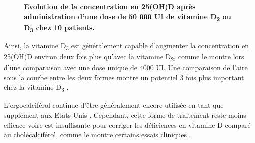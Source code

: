 \documentclass[
  a4paper,
  DIV=11,
  numbers=noendperiod,
  listof=totoc]{scrreprt}
\begin{document}
\begin{figure}


\caption[Evolution de la concentration en 25(OH)D après administration
d'une dose de 50 000 UI de vitamine D\textsubscript{2} ou
D\textsubscript{3} chez 10 patients.]{\label{fig-PK}\textbf{Evolution de
la concentration en 25(OH)D après administration d'une dose de 50 000 UI
de vitamine D\textsubscript{2} ou D\textsubscript{3} chez 10 patients.}
\autocite{Armas.2004}}

\end{figure}%

Ainsi, la vitamine D\textsubscript{3} est généralement capable
d'augmenter la concentration en 25(OH)D environ deux fois plus qu'avec
la vitamine D\textsubscript{2}, comme le montre \textcite{Trang.1998}
lors d'une comparaison avec une dose unique de 4000 UI. Une comparaison
de l'aire sous la courbe entre les deux formes montre un potentiel 3
fois plus important chez la vitamine D\textsubscript{3}
\autocite{Armas.2004}.

L'ergocalciférol continue d'être généralement encore utilisée en tant
que supplément aux Etats-Unis \autocite{Houghton.2006}. Cependant, cette
forme de traitement reste moins efficace voire est insuffisante pour
corriger les déficiences en vitamine D comparé au cholécalciférol, comme
le montre certains essais cliniques \autocite{Boyle.2005}.
\end{document}
